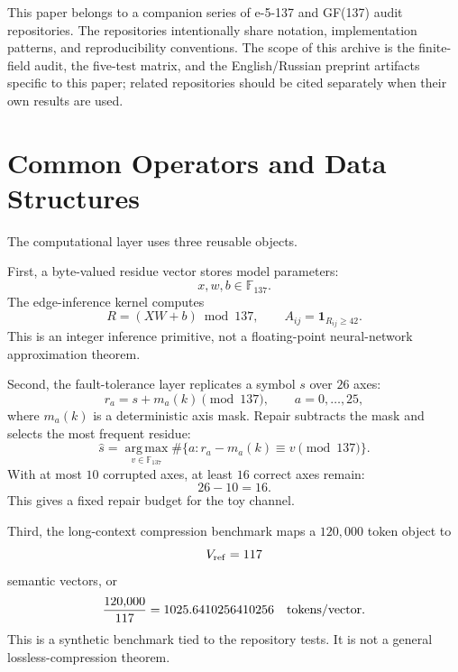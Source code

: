 \documentclass[11pt]{article}
\begin{document}
This paper belongs to a companion series of e-5-137 and GF(137) audit
repositories.  The repositories intentionally share notation, implementation
patterns, and reproducibility conventions.  The scope of this archive is the
finite-field audit, the five-test matrix, and the English/Russian preprint
artifacts specific to this paper; related repositories should be cited
separately when their own results are used.

\section{Common Operators and Data Structures}

The computational layer uses three reusable objects.

First, a byte-valued residue vector stores model parameters:
\begin{equation}
    x,w,b\in\mathbb{F}_{137}.
\end{equation}
The edge-inference kernel computes
\begin{equation}
    R=(XW+b)\bmod 137,\qquad A_{ij}=\mathbf{1}_{R_{ij}\ge42}.
\end{equation}
This is an integer inference primitive, not a floating-point neural-network
approximation theorem.

Second, the fault-tolerance layer replicates a symbol $s$ over $26$ axes:
\begin{equation}
    r_a=s+m_a(k)\pmod{137},\qquad a=0,\ldots,25,
\end{equation}
where $m_a(k)$ is a deterministic axis mask.  Repair subtracts the mask and
selects the most frequent residue:
\begin{equation}
    \hat{s}
    =
    \operatorname*{arg\,max}_{v\in\mathbb{F}_{137}}
    \#\{a:r_a-m_a(k)\equiv v\pmod{137}\}.
\end{equation}
With at most $10$ corrupted axes, at least $16$ correct axes remain:
\begin{equation}
    26-10=16.
\end{equation}
This gives a fixed repair budget for the toy channel.

Third, the long-context compression benchmark maps a $120{,}000$ token object
to
\begin{equation}
    V_{\rm ref}=117
\end{equation}
semantic vectors, or
\begin{equation}
    \frac{120{,}000}{117}=1025.6410256410256
    \quad {\rm tokens/vector}.
\end{equation}
This is a synthetic benchmark tied to the repository tests.  It is not a
general lossless-compression theorem.
\end{document}
